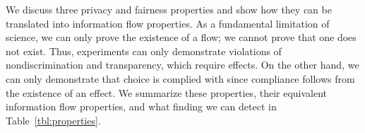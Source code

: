 \documentclass[10pt, onecolumn]{report}
\begin{document}
We discuss three privacy and fairness properties and show how they can be translated
into information flow properties. As a fundamental limitation of science, we can only prove the existence of a flow; we cannot prove that one does not exist.
Thus, experiments can only demonstrate violations of 
nondiscrimination and transparency, which require effects.
On the other hand, we can only demonstrate that 
choice is complied with %
since compliance follows from the existence of an effect. 
We summarize these properties, their equivalent 
information flow properties, and what finding we can detect in
Table~\ref{tbl:properties}.

\end{document}
